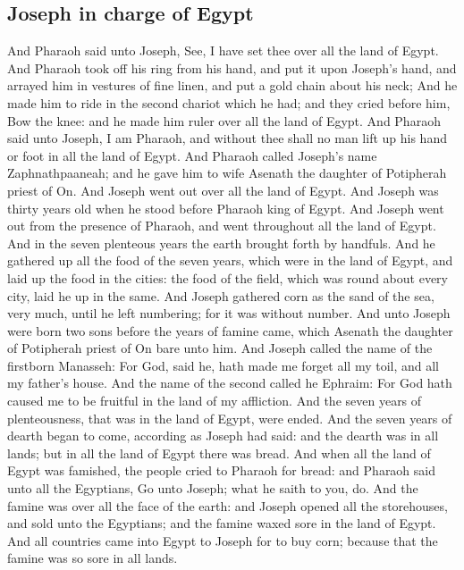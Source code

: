 \begin{biblechapter}
\section*{Joseph in charge of Egypt}
\verse And Pharaoh said unto Joseph, See, I have set thee over all the land of Egypt.
\verse And Pharaoh took off his ring from his hand, and put it upon Joseph's hand, and arrayed him in vestures of fine linen, and put a gold chain about his neck;
\verse And he made him to ride in the second chariot which he had; and they cried before him, Bow the knee: and he made him ruler over all the land of Egypt.
\verse And Pharaoh said unto Joseph, I am Pharaoh, and without thee shall no man lift up his hand or foot in all the land of Egypt.
\verse And Pharaoh called Joseph's name Zaphnathpaaneah; and he gave him to wife Asenath the daughter of Potipherah priest of On. And Joseph went out over all the land of Egypt.
\verse And Joseph was thirty years old when he stood before Pharaoh king of Egypt. And Joseph went out from the presence of Pharaoh, and went throughout all the land of Egypt.
\verse And in the seven plenteous years the earth brought forth by handfuls.
\verse And he gathered up all the food of the seven years, which were in the land of Egypt, and laid up the food in the cities: the food of the field, which was round about every city, laid he up in the same.
\verse And Joseph gathered corn as the sand of the sea, very much, until he left numbering; for it was without number.
\verse And unto Joseph were born two sons before the years of famine came, which Asenath the daughter of Potipherah priest of On bare unto him.
\verse And Joseph called the name of the firstborn Manasseh: For God, said he, hath made me forget all my toil, and all my father's house.
\verse And the name of the second called he Ephraim: For God hath caused me to be fruitful in the land of my affliction.
\verse And the seven years of plenteousness, that was in the land of Egypt, were ended.
\verse And the seven years of dearth began to come, according as Joseph had said: and the dearth was in all lands; but in all the land of Egypt there was bread.
\verse And when all the land of Egypt was famished, the people cried to Pharaoh for bread: and Pharaoh said unto all the Egyptians, Go unto Joseph; what he saith to you, do.
\verse And the famine was over all the face of the earth: and Joseph opened all the storehouses, and sold unto the Egyptians; and the famine waxed sore in the land of Egypt.
\verse And all countries came into Egypt to Joseph for to buy corn; because that the famine was so sore in all lands.
\end{biblechapter}

